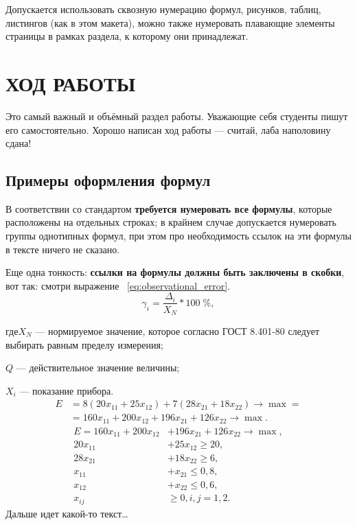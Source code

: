 \documentclass[a4paper,hidelinks,14pt]{extarticle}
\begin{document}
Допускается использовать сквозную нумерацию формул, рисунков, таблиц, листингов (как в этом макета),
можно также нумеровать плавающие элементы страницы в рамках раздела, к которому они принадлежат.

\section{ХОД РАБОТЫ}

Это самый важный и объёмный раздел работы. Уважающие себя студенты пишут его самостоятельно.
Хорошо написан ход работы --- считай, лаба наполовину сдана!

\subsection{Примеры оформления формул}

В соответствии со стандартом \textbf{требуется нумеровать все
	формулы}, которые расположены на отдельных строках; в крайнем случае допускается нумеровать
группы однотипных формул, при этом про необходимость ссылок на эти формулы в тексте ничего не сказано.

Еще одна тонкость: \textbf{ссылки на формулы должны быть заключены в скобки}, вот так: смотри выражение ~\eqref{eq:observational_error}.
\begin{equation}
	\label{eq:observational_error}
	\gamma_{i} = \dfrac{\Delta_{i}}{X_{N}}*100\;\%,
\end{equation}

\noindent где\hspace{1em}$ X_{N} $ --- нормируемое значение, которое согласно ГОСТ 8.401-80
следует выбирать равным пределу измерения;

$ Q $ --- действительное значение величины;

$ X_{i} $ --- показание прибора.
\begin{equation}
	\label{eq:BaseOpt}
	\begin{aligned}
		E &= 8(20x_{11} + 25x_{12}) + 7(28x_{21} + 18x_{22}) \rightarrow \max = \\
		&= 160x_{11} + 200x_{12} + 196x_{21} + 126x_{22} \rightarrow \max.
	\end{aligned}
\end{equation}
\begin{equation}
	\label{eq:BaseNSM}
	\begin{aligned}
		E = 160x_{11} + 200x_{12} &+ 196x_{21} + 126x_{22} \rightarrow \max, \\
		20x_{11} &+ 25x_{12} \ge 20, \\
		28x_{21} &+ 18x_{22} \ge 6, \\
		x_{11} &+ x_{21} \le 0{,}8, \\
		x_{12} &+ x_{22} \le 0{,}6, \\
		x_{ij} & \ge 0, i, j = 1, 2.
	\end{aligned}
\end{equation}
Дальше идет какой-то текст\dots
\end{document}
